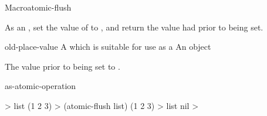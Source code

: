 
\begin{functiondoc}{Macro}{atomic-flush}{ \returns{}
    }
%

\fnsyntax

\fnpurpose As an , set the value of
 to \nil, and return the value  had
prior to being set.

\fnpackage {}

\fnmodule {}

\fnargs
\begin{args}{old-place-value}
\arg[place] A  which is suitable for use as a
 An object
\end{args}

\fnreturns The  value prior to being set to \nil.

\begin{alsos}{as-atomic-operation}
\end{alsos}

\fnexample
%
\W\supp
\begin{example}
  > list
  (1 2 3)
  > (atomic-flush list)
  (1 2 3)
  > list
  nil
  >
\end{example}

\end{functiondoc}


